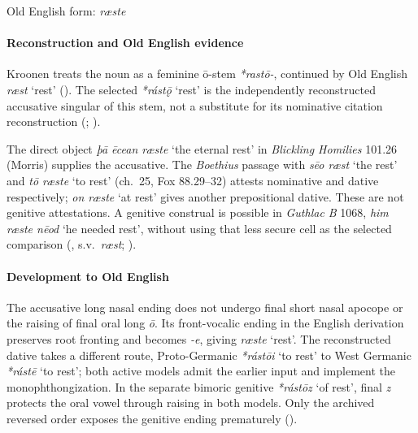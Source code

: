 \documentclass[
  british,
  a4paper,
]{article}
\providecommand{\Recon}[1]{\emph{*#1}}
\begin{document}
Old English form: \emph{ræste}

\paragraph{Reconstruction and Old English
evidence}\label{reconstruction-and-old-english-evidence}

Kroonen treats the noun as a feminine ō-stem {\emph{*rastō-}}, continued
by Old English {\emph{ræst}} `rest' (). The selected \Recon{rástǭ} `rest' is the independently
reconstructed accusative singular of this stem, not a substitute for its
nominative citation reconstruction (; ).

The direct object \emph{þā ēcean ræste} `the eternal rest' in
\emph{Blickling Homilies} 101.26 (Morris) supplies the accusative. The
\emph{Boethius} passage with \emph{sēo ræst} `the rest' and \emph{tō
ræste} `to rest' (ch.~25, Fox 88.29--32) attests nominative and dative
respectively; \emph{on ræste} `at rest' gives another prepositional
dative. These are not genitive attestations. A genitive construal is
possible in \emph{Guthlac B} 1068, \emph{him ræste nēod} `he needed
rest', without using that less secure cell as the selected comparison
(,
s.v.~\emph{ræst}; ).

\paragraph{Development to Old
English}\label{development-to-old-english-141}

The accusative long nasal ending does not undergo final short nasal
apocope or the raising of final oral long \emph{ō}. Its front-vocalic
ending in the English derivation preserves root fronting and becomes
\emph{-e}, giving {\emph{ræste}} `rest'. The reconstructed dative takes
a different route, Proto-Germanic \Recon{rástōi} `to rest' to West
Germanic \Recon{rástē} `to rest'; both active models admit the earlier
input and implement the monophthongization. In the separate bimoric
genitive \Recon{rástōz} `of rest', final \emph{z} protects the oral
vowel through raising in both models. Only the archived reversed order
exposes the genitive ending prematurely
().
\end{document}
